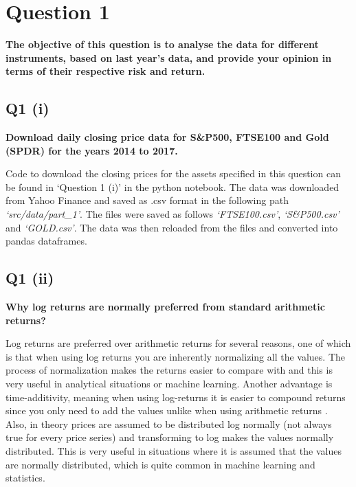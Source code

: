 \section{Question 1}\label{ssec:pt1q1}
\textbf{The objective of this question is to analyse the data for different instruments, based on last year’s data, and provide your opinion in terms of their respective risk and return.}



\subsection{Q1 (i)}\label{sssec:pt1q1i}
\textbf{Download daily closing price data for S\&P500, FTSE100 and Gold (SPDR) for the years 2014 to 2017.}

\noindent
Code to download the closing prices for the assets specified in this question can be found in ‘Question 1 (i)’ in the python notebook. The data was downloaded from Yahoo Finance and saved as .csv format in the following path \textit{‘src/data/part\_1’}. The files were saved as follows \textit{‘FTSE100.csv’}, \textit{‘S\&P500.csv’} and \textit{‘GOLD.csv’}. The data was then reloaded from the files and converted into pandas dataframes. 



\subsection{Q1 (ii)}\label{sssec:pt1q1ii}
\textbf{Why log returns are normally preferred from standard arithmetic returns?}

\noindent
Log returns are preferred over arithmetic returns for several reasons, one of which is that when using log returns you are inherently normalizing all the values. The process of normalization makes the returns easier to compare with and this is very useful in analytical situations or machine learning. Another advantage is time-additivity, meaning when using log-returns it is easier to compound returns since you only need to add the values unlike when using arithmetic returns \cite{meucci2010quant}. Also, in theory prices are assumed to be distributed log normally (not always true for every price series) and transforming to log makes the values normally distributed. This is very useful in situations where it is assumed that the values are normally distributed, which is quite common in machine learning and statistics.

